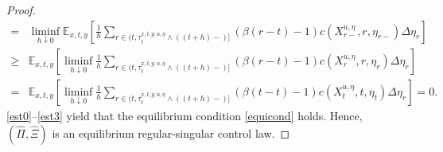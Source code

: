 \documentclass[10pt,a4paper]{amsart}
\begin{document}
\begin{proof}
\begin{equation}
\begin{aligned}
=&\liminf\limits_{h\downarrow 0}\mathbb{E}_{x,t,y}\left[\frac{1}{h}\sum\limits_{r\in(t,\tau^{x,t,y;u,\eta}_{t}\wedge((t+h)-)]}\left(\beta(r-t)-1\right) c\left(X^{u,\eta}_{r-}, r, \eta_{r-}\right)\Delta\eta_{r}\right]\\
\geq&\mathbb{E}_{x,t,y}\left[\liminf\limits_{h\downarrow 0}\frac{1}{h}\sum\limits_{r\in(t,\tau^{x,t,y;u,\eta}_{t}\wedge((t+h)-)]}\left(\beta(r-t)-1\right) c\left(X^{u,\eta}_{r}, r, \eta_{r}\right)\Delta\eta_{r} \right]\\
=&\mathbb{E}_{x,t,y}\left[\liminf\limits_{h\downarrow 0}\frac{1}{h}\sum\limits_{r\in(t,\tau^{x,t,y;u,\eta}_{t}\wedge((t+h)-)]}\left(\beta(t-t)-1\right)c(X^{u,\eta}_t, t, \eta_t)\Delta\eta_{r}\right]= 0.
\end{aligned}\label{est3}\end{equation}
\eqref{est0}--\eqref{est3} yield that the equilibrium condition \eqref{equicond} holds. Hence, $(\hat{\Pi},\hat{\Xi})$ is an equilibrium  regular-singular control law.
\end{proof}
\end{document}

